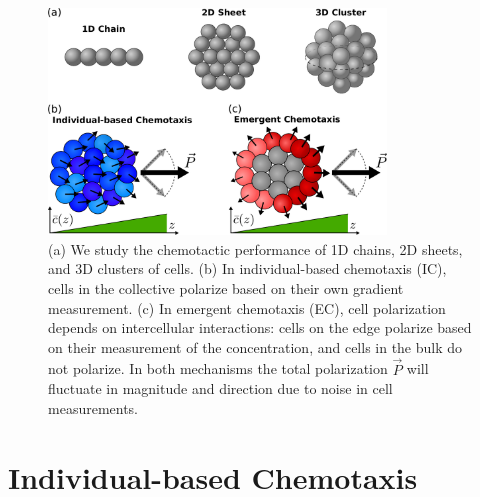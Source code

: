 \begin{figure}
    \centering
        \includegraphics[width=0.8\textwidth]{../fig/ch3_fig1.pdf}
    \caption{(a) We study the chemotactic performance of 1D chains, 2D sheets, and 3D clusters of cells. (b) In individual-based chemotaxis (IC), cells in the collective polarize based on their own gradient measurement. (c) In emergent chemotaxis (EC), cell polarization depends on intercellular interactions: cells on the edge polarize based on their measurement of the concentration, and cells in the bulk do not polarize. In both mechanisms the total polarization $\vec{P}$ will fluctuate in magnitude and direction due to noise in cell measurements.} \label{fig:ch3_1}
\end{figure}


\section{Individual-based Chemotaxis}

